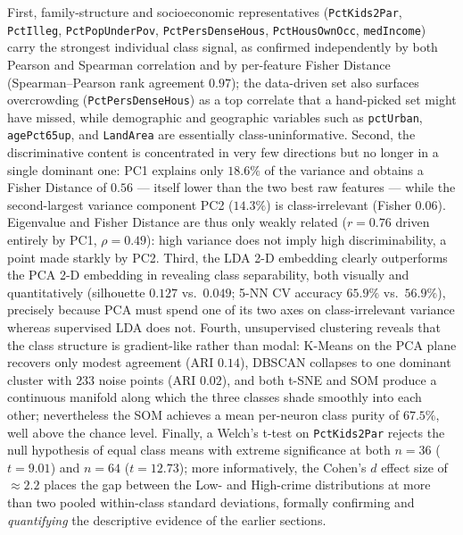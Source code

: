 \documentclass{ieeeaccess}
\begin{document}
First, family-structure and socioeconomic representatives (\texttt{PctKids2Par}, \texttt{PctIlleg}, \texttt{PctPopUnderPov}, \texttt{PctPersDenseHous}, \texttt{PctHousOwnOcc}, \texttt{medIncome}) carry the strongest individual class signal, as confirmed independently by both Pearson and Spearman correlation and by per-feature Fisher Distance (Spearman--Pearson rank agreement $0.97$); the data-driven set also surfaces overcrowding (\texttt{PctPersDenseHous}) as a top correlate that a hand-picked set might have missed, while demographic and geographic variables such as \texttt{pctUrban}, \texttt{agePct65up}, and \texttt{LandArea} are essentially class-uninformative. Second, the discriminative content is concentrated in very few directions but no longer in a single dominant one: PC1 explains only $18.6\%$ of the variance and obtains a Fisher Distance of $0.56$ --- itself lower than the two best raw features --- while the second-largest variance component PC2 ($14.3\%$) is class-irrelevant (Fisher $0.06$). Eigenvalue and Fisher Distance are thus only weakly related ($r=0.76$ driven entirely by PC1, $\rho=0.49$): high variance does not imply high discriminability, a point made starkly by PC2. Third, the LDA 2-D embedding clearly outperforms the PCA 2-D embedding in revealing class separability, both visually and quantitatively (silhouette $0.127$ vs.\ $0.049$; 5-NN CV accuracy $65.9\%$ vs.\ $56.9\%$), precisely because PCA must spend one of its two axes on class-irrelevant variance whereas supervised LDA does not. Fourth, unsupervised clustering reveals that the class structure is gradient-like rather than modal: K-Means on the PCA plane recovers only modest agreement (ARI $0.14$), DBSCAN collapses to one dominant cluster with $233$ noise points (ARI $0.02$), and both t-SNE and SOM produce a continuous manifold along which the three classes shade smoothly into each other; nevertheless the SOM achieves a mean per-neuron class purity of $67.5\%$, well above the chance level. Finally, a Welch's t-test on \texttt{PctKids2Par} rejects the null hypothesis of equal class means with extreme significance at both $n=36$ ($t=9.01$) and $n=64$ ($t=12.73$); more informatively, the Cohen's $d$ effect size of $\approx 2.2$ places the gap between the Low- and High-crime distributions at more than two pooled within-class standard deviations, formally confirming and \emph{quantifying} the descriptive evidence of the earlier sections.
\end{document}
